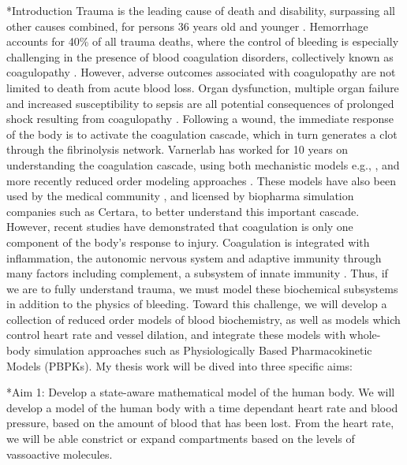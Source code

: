 \documentclass[11pt]{article}
\makeatletter
\renewcommand\subsubsection{\@startsection
	{subsubsection}{2}{0mm}
	{-0.05in}
	{-0.5\baselineskip}
	{\normalfont\normalsize\bfseries}}
\renewcommand\section{\@startsection
	{subsection}{2}{0mm}
	{-0.2in}
	{0.05\baselineskip}
	{\normalfont\large\bfseries}}
\makeatother
\begin{document}
\section*{Introduction}
Trauma is the leading cause of death and disability, surpassing all other causes combined, for persons 36 years old and younger \cite{Krug:2000aa}.
Hemorrhage accounts for 40\% of all trauma deaths, where the control of bleeding is especially challenging in the presence of blood coagulation disorders, collectively known as coagulopathy \cite{Sauaia:1995aa}. However, adverse outcomes associated with coagulopathy are not limited to death from acute blood loss.
Organ dysfunction, multiple organ failure and increased susceptibility to sepsis \cite{Esmon:2005aa}
are all potential consequences of prolonged shock resulting from coagulopathy \cite{Sauaia:1994aa}.
Following a wound, the immediate response of the body is to activate the coagulation cascade, which in turn generates a clot through the fibrinolysis network.
Varnerlab has worked for 10 years on understanding the coagulation cascade,
using both mechanistic models e.g., \cite{Luan:2007aa,Luan:2010aa}, and more recently reduced order modeling approaches \cite{pr3010178}.
These models have also been used by the medical community \cite{Szlam:2010aa,Rice:2016aa}, and licensed by  biopharma simulation companies such as Certara, to better understand this important cascade. However, recent studies have demonstrated that coagulation is only one component of the body's response to injury.
Coagulation is integrated with inflammation, the autonomic nervous system and adaptive immunity through many factors including complement, a subsystem of innate immunity \cite{Rittirsch:2008aa}. Thus, if we are to fully understand trauma, we must model these biochemical subsystems in addition to the physics of bleeding.
Toward this challenge, we will develop a collection of reduced order models of blood biochemistry,
as well as models which control heart rate and vessel dilation, and integrate these models with whole-body simulation approaches such as Physiologically Based Pharmacokinetic Models (PBPKs).
My thesis work will be dived into three specific aims:

\subsubsection*{Aim 1: Develop a state-aware mathematical model of the human body.} We will develop a model of the human body with a time dependant heart rate and blood pressure, based on the amount of blood that has been lost. From the heart rate, we will be able constrict or expand compartments based on the levels of vassoactive molecules. 
\end{document}

